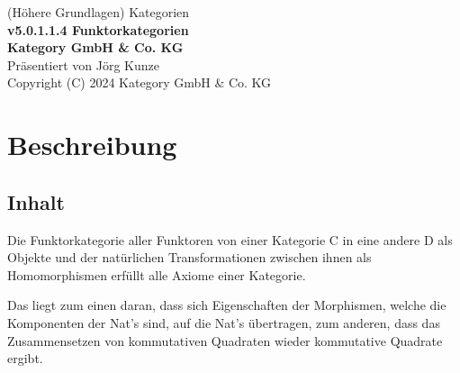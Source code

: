 \documentclass[a4paper]{amsart}
\theoremstyle{definition}
\begin{document}
\begin{titlepage}
\centering
{\huge
(Höhere Grundlagen) Kategorien\\[1cm]
\textbf{v5.0.1.1.4 Funktorkategorien}
}\\[1cm]

\textbf{Kategory GmbH \& Co. KG}\\
Präsentiert von Jörg Kunze\\
Copyright (C) 2024 Kategory GmbH \& Co. KG

\end{titlepage}

%

\newpage

\section*{Beschreibung}

\subsection*{Inhalt}
Die Funktorkategorie aller Funktoren von einer Kategorie C in eine andere D als Objekte und der natürlichen Transformationen zwischen ihnen als Homomorphismen erfüllt alle Axiome einer Kategorie.

Das liegt zum einen daran, dass sich Eigenschaften der Morphismen, welche die Komponenten der Nat's sind, auf die Nat's übertragen, zum anderen, dass das Zusammensetzen von kommutativen Quadraten wieder kommutative Quadrate ergibt.
\end{document}
